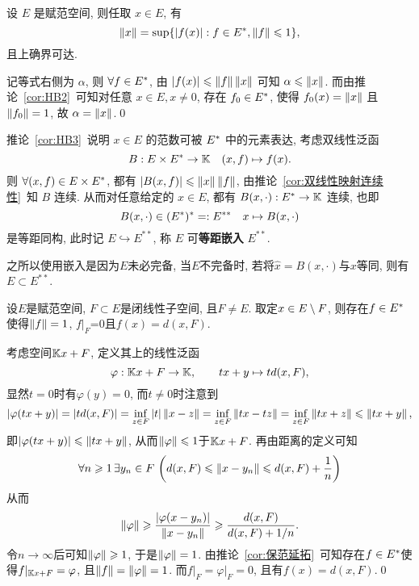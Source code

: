 \begin{Corollary}\label{cor:HB3}
	设 $ E $ 是赋范空间, 则任取 $ x\in E $, 有
	\[
		\left\| x \right\|=\sup\{ \left| f(x) \right| :f\in E^{*}, \left\| f \right\|\leqslant1 \},
	\]
	且上确界可达.
\end{Corollary}
\begin{Proof}
	记等式右侧为 $ \alpha $, 则 $ \forall f\in E^{*} $, 由 $ \left| f(x) \right| \leqslant\left\| f \right\|\left\| x \right\| $ 可知 $ \alpha \leqslant\left\| x \right\| $. 而由推论~\ref{cor:HB2}~可知对任意 $ x\in E, x\ne 0 $, 存在 $ f_{0}\in E^{*} $, 使得 $ f_{0}(x)=\left\| x \right\| $ 且 $ \left\| f_{0} \right\|=1 $, 故 $ \alpha =\left\| x \right\| $.\qed
\end{Proof}
推论~\ref{cor:HB3}~说明 $ x\in E $ 的范数可被 $ E^{*} $ 中的元素表达, 考虑双线性泛函
\[
	B:E\times E^{*}\to\mathbb{K}\quad(x, f)\mapsto f(x).
\]
则 $ \forall(x, f)\in E\times E^{*} $, 都有 $ \left| B(x, f) \right| \leqslant\left\| x \right\|\left\| f \right\| $, 由推论~\ref{cor:双线性映射连续性}~知 $ B $ 连续. 从而对任意给定的 $ x\in E $, 都有 $ B(x, \cdot):E^{*}\to\mathbb{K} $ 连续, 也即
\[
	B(x,\cdot)\in(E^{*})^{*}=: E^{**}\quad x\mapsto B(x, \cdot)
\]
是等距同构, 此时记 $ E\hookrightarrow E^{**} $, 称 $ E $ 可\textbf{等距嵌入} $ E^{**} $.

之所以使用嵌入是因为$ E $未必完备, 当$ E $不完备时, 若将$ \hat{x}=B(x,\cdot) $与$ x $等同, 则有$ E\subset E^{**} $.

\begin{Corollary}\label{cor:HB4}
	设$ E $是赋范空间, $ F\subset E $是闭线性子空间, 且$ F\ne E $. 取定$ x\in E\setminus F $, 则存在$ f\in E^{*} $使得$ \left\| f \right\|=1 $, $ f\rvert_F $=0且$ f(x)=d(x,F) $.
\end{Corollary}
\begin{Proof}
	考虑空间$ \mathbb{K} x+F $, 定义其上的线性泛函
	\[
		\varphi : \mathbb{K} x+F\to\mathbb{K},\qquad tx+y\mapsto td(x,F),
	\]
	显然$ t=0 $时有$ \varphi(y)=0 $, 而$ t\ne 0 $时注意到
	\[
		\left| \varphi(tx+y) \right| =\left| td(x,F) \right| =\inf_{z\in F}\left| t \right| \left\| x-z \right\|=\inf_{z\in F}\left\| tx-tz \right\|=\inf_{z\in F}\left\| tx+z \right\|\leqslant\left\| tx+y \right\|,
	\]
	即$ \left| \varphi(tx+y) \right| \leqslant\left\| tx+y \right\| $, 从而$ \left\| \varphi \right\|\leqslant 1 $于$ \mathbb{K} x+F $. 再由距离的定义可知
	\[
		\forall n\geqslant 1\,\exists y_n\in F\,\left(d(x,F)\leqslant\left\| x-y_n \right\|\leqslant d(x,F)+\frac{1}{n}\right)
	\]
	从而
	\[
		\left\| \varphi \right\|\geqslant\frac{\left| \varphi(x-y_n) \right| }{\left\| x-y_n \right\|}\geqslant\frac{d(x,F)}{d(x,F)+1/n}.
	\]
	令$ n\to\infty $后可知$ \left\| \varphi \right\|\geqslant 1 $, 于是$ \left\| \varphi \right\|=1 $. 由推论~\ref{cor:保范延拓}~可知存在$ f\in E^{*} $使得$ f\rvert_{\mathbb{K} x+F}=\varphi $, 且$ \left\| f \right\|=\left\| \varphi \right\|=1 $. 而$ f\rvert_F=\varphi\rvert_F=0 $, 且有$ f(x)=d(x,F) $.\qed
\end{Proof}

